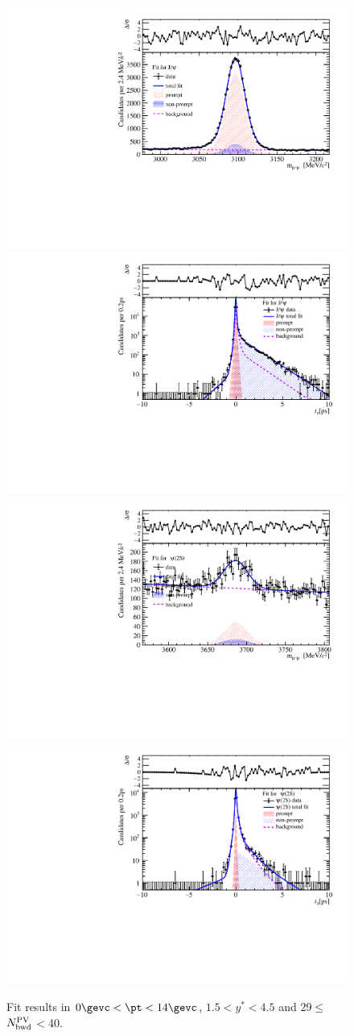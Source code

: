 \begin{figure}[H]
\begin{center}
\includegraphics[width=0.45\linewidth]{pdf/Pbp/BWorkdir/TwoDimFit/ProjMass/Jpsi_n3y1pt1.pdf}
\includegraphics[width=0.45\linewidth]{pdf/Pbp/BWorkdir/TwoDimFit/ProjTz/Jpsi_n3y1pt1.pdf}
\vspace*{-0.5cm}
\includegraphics[width=0.45\linewidth]{pdf/Pbp/BWorkdir/TwoDimFit/ProjMass/Psi2S_n3y1pt1.pdf}
\includegraphics[width=0.45\linewidth]{pdf/Pbp/BWorkdir/TwoDimFit/ProjTz/Psi2S_n3y1pt1.pdf}
\vspace*{-0.5cm}
\end{center}
\caption{Fit results in $0\gevc<\pt<14\gevc$, $1.5<y^*<4.5$ and 29$\leq$$N_{\rm bwd}^{\rm PV}$$<$40.}
\end{figure}
